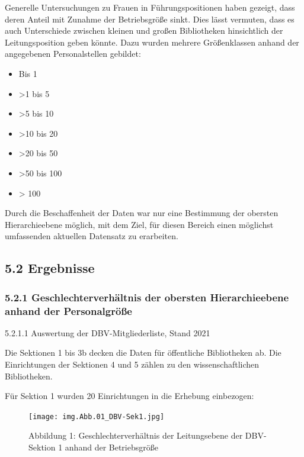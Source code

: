 \documentclass[a4paper,
fontsize=11pt,
oneside,
numbers=noperiodatend,
parskip=half-,
bibliography=totoc,
final
]{scrartcl}
\begin{document}
Generelle Untersuchungen zu Frauen in Führungspositionen haben gezeigt,
dass deren Anteil mit Zunahme der Betriebsgröße sinkt. Dies lässt
vermuten, dass es auch Unterschiede zwischen kleinen und großen
Bibliotheken hinsichtlich der Leitungsposition geben könnte. Dazu wurden
mehrere Größenklassen anhand der angegebenen Personalstellen gebildet:

\begin{itemize}
\item
  Bis 1
\item
  \textgreater1 bis 5
\item
  \textgreater5 bis 10
\item
  \textgreater10 bis 20
\item
  \textgreater20 bis 50
\item
  \textgreater50 bis 100
\item
  \textgreater{} 100
\end{itemize}

Durch die Beschaffenheit der Daten war nur eine Bestimmung der obersten
Hierarchieebene möglich, mit dem Ziel, für diesen Bereich einen
möglichst umfassenden aktuellen Datensatz zu erarbeiten.

\hypertarget{ergebnisse}{%
\subsection{5.2 Ergebnisse}\label{ergebnisse}}

\hypertarget{geschlechterverhuxe4ltnis-der-obersten-hierarchieebene-anhand-der-personalgruxf6uxdfe}{%
\subsubsection{5.2.1 Geschlechterverhältnis der obersten Hierarchieebene
anhand der
Personalgröße}\label{geschlechterverhuxe4ltnis-der-obersten-hierarchieebene-anhand-der-personalgruxf6uxdfe}}

5.2.1.1 Auswertung der DBV-Mitgliederliste, Stand 2021

Die Sektionen 1 bis 3b decken die Daten für öffentliche Bibliotheken ab.
Die Einrichtungen der Sektionen 4 und 5 zählen zu den wissenschaftlichen
Bibliotheken.

Für Sektion 1 wurden 20 Einrichtungen in die Erhebung einbezogen:

\begin{figure}
\centering
\texttt{[image: img.Abb.01\_DBV-Sek1.jpg]}
\caption*{Abbildung 1: Geschlechterverhältnis der Leitungsebene der
DBV-Sektion 1 anhand der Betriebsgröße}
\end{figure}
\end{document}
